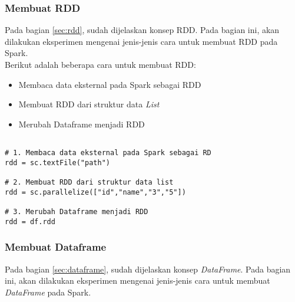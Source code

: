 \newpage
\subsubsection{Membuat RDD}
Pada bagian \ref{sec:rdd}, sudah dijelaskan konsep RDD. Pada bagian ini, akan dilakukan eksperimen mengenai jenis-jenis cara untuk membuat RDD pada Spark.\\

\noindent Berikut adalah beberapa cara untuk membuat RDD:
\begin{itemize}
\item Membaca data eksternal pada Spark sebagai RDD
\item Membuat RDD dari struktur data \textit{List}
\item Merubah Dataframe menjadi RDD
\end{itemize}

\begin{lstlisting}[basicstyle=\ttfamily, frame=single,
	columns=fullflexible, keepspaces=true, breaklines=true, label=ls_kepatuhan_1_1_1_logo_sharif_judge, caption=Cara Pembuatan RDD]
	
# 1. Membaca data eksternal pada Spark sebagai RD
rdd = sc.textFile("path")

# 2. Membuat RDD dari struktur data list
rdd = sc.parallelize(["id","name","3","5"])

# 3. Merubah Dataframe menjadi RDD
rdd = df.rdd

\end{lstlisting}

\subsubsection{Membuat Dataframe}
Pada bagian \ref{sec:dataframe}, sudah dijelaskan konsep \textit{DataFrame}. Pada bagian ini, akan dilakukan eksperimen mengenai jenis-jenis cara untuk membuat \textit{DataFrame} pada Spark.\\

